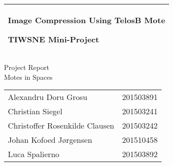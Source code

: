 %
%
%
%
%
\begin{titlepage}
  \addtolength{\hoffset}{0.5\evensidemargin-0.5\oddsidemargin} %
  \noindent%
  \begin{tabular}{@{}p{\textwidth}@{}}
    \toprule[2pt]
    \midrule
    \vspace{0.2cm}
    \begin{center}
    \Huge{\textbf{
      Image Compression Using TelosB Mote%
    }}
    \end{center}
    \begin{center}
      \Large{
        TIWSNE Mini-Project%
      }
    \end{center}
    \vspace{0.2cm}\\
    \midrule
    \toprule[2pt]
  \end{tabular}
  \vspace{4 cm}
  \begin{center}
    {\large
      Project Report%
    }\\
    \vspace{0.4cm}
    {\Large
      Motes in Spaces%
    }\\
    \vspace{0.2cm}
    \begin{tabular}{ll}
      Alexandru Doru Grosu              & 201503891\\
      Christian Siegel                  & 201503241\\
      Christoffer Rosenkilde Clausen    & 201503242\\
      Johan Kofoed Jørgensen            & 201510458\\ 
      Luca Spalierno                    & 201503892\\ 
    \end{tabular}
  \end{center}
\end{titlepage}
\clearpage
